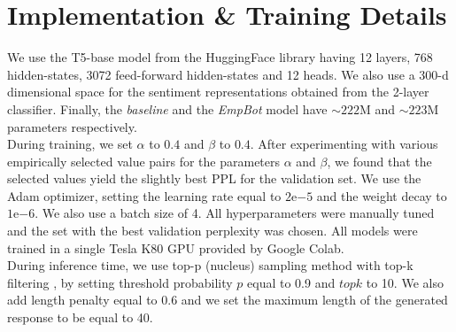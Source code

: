 \documentclass[11pt]{article}
\begin{document}
\section{Implementation \& Training Details}\label{sec:train_details}
We use the T5-base model from the HuggingFace library having 12 layers, 768 hidden-states, 3072 feed-forward hidden-states and 12 heads. We also use a 300-d dimensional space for the sentiment representations obtained from the 2-layer classifier. Finally, the \textit{baseline} and the \textit{EmpBot} model have $\sim222$M and $\sim223$M parameters respectively.\\
During training, we set $\alpha$ to $0.4$ and $\beta$ to $0.4$. After experimenting with various empirically selected value pairs for the parameters $\alpha$ and $\beta$, we found that the selected values yield the slightly best PPL for the validation set. We use the Adam optimizer, setting the learning rate equal to $2\mathrm{e}{-5}$ and the weight decay to $1\mathrm{e}{-6}$. We also use a batch size of 4. All hyperparameters were manually tuned and the set with the best validation perplexity was chosen. All models were trained in a single Tesla K80 GPU provided by Google Colab. \\
During inference time, we use top-p (nucleus) sampling method \citep{Hotzman_2019_topp} with top-k filtering \citep{Fan_2018_topk}, by setting threshold probability $p$ equal to 0.9 and $topk$ to 10. We also add length penalty equal to 0.6 and we set the maximum length of the generated response to be equal to 40.
\end{document}
